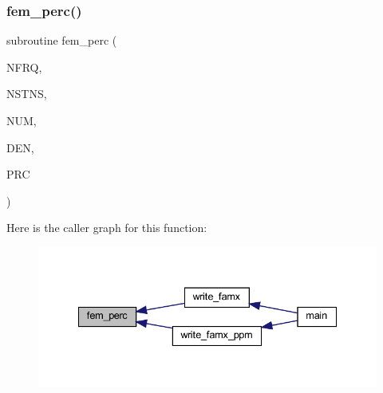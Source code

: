 \subsubsection{\texorpdfstring{fem\+\_\+perc()}{fem\_perc()}}
{\footnotesize\ttfamily subroutine fem\+\_\+perc (\begin{DoxyParamCaption}\item[{integer, intent(in)}]{N\+F\+RQ,  }\item[{integer, intent(in)}]{N\+S\+T\+NS,  }\item[{complex, dimension(nfrq, nstns), intent(in)}]{N\+UM,  }\item[{complex, dimension(nfrq, nstns), intent(in)}]{D\+EN,  }\item[{complex, dimension(nfrq, nstns), intent(out)}]{P\+RC }\end{DoxyParamCaption})}

Here is the caller graph for this function\+:
\nopagebreak
\begin{figure}[H]
\begin{center}
\leavevmode
\includegraphics[width=335pt]{Marco_8f90_afd1cc93ca825c04293fe19df43045f99_icgraph}
\end{center}
\end{figure}
\mbox{\label{Marco_8f90_adf5b72e5e0c8b51d6d076cc274531811}} 
